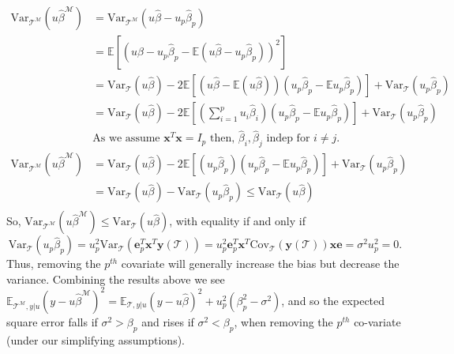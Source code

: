 \documentclass{article}
\begin{document}
\begin{equation*}
\begin{split}
\text{Var}_{\mathcal{T}^\mathcal{M}}(u\hat{\beta}^\mathcal{M}) &= \text{Var}_{\mathcal{T}^\mathcal{M}}(u\hat{\beta}- u_p\hat{\beta}_p) \\
&= \mathbb{E}\left[\left(u\hat{\beta}-u_p \hat{\beta}_p-\mathbb{E}(u\hat{\beta}-u_p \hat{\beta}_p)\right)^2 \right] \\
&= \text{Var}_{\mathcal{T}}(u\hat{\beta})-2\mathbb{E}\left[(u\hat{\beta}-\mathbb{E}(u\hat{\beta}))(u_p \hat{\beta}_p-\mathbb{E}u_p \hat{\beta}_p) \right] + \text{Var}_{\mathcal{T}}(u_p \hat{\beta}_p) \\
&= \text{Var}_{\mathcal{T}}(u\hat{\beta})-2\mathbb{E}\left[ \left(\sum_{i=1}^p u_i \hat{\beta}_i \right) \left(u_p \hat{\beta}_p-\mathbb{E}u_p \hat{\beta}_p \right) \right] + \text{Var}_{\mathcal{T}}(u_p \hat{\beta}_p) \\
&\text{As we assume } \textbf{x}^T\textbf{x}=I_p \text{ then, } \hat{\beta}_i, \hat{\beta}_j \text{ indep for } i \neq j. \\
\text{Var}_{\mathcal{T}^\mathcal{M}}(u\hat{\beta}^\mathcal{M}) &= \text{Var}_{\mathcal{T}}(u\hat{\beta})-2\mathbb{E}\left[(u_p \hat{\beta}_p)(u_p \hat{\beta}_p-\mathbb{E}u_p \hat{\beta}_p) \right] + \text{Var}_{\mathcal{T}}(u_p \hat{\beta}_p) \\
&= \text{Var}_{\mathcal{T}}(u\hat{\beta})- \text{Var}_{\mathcal{T}}(u_p \hat{\beta}_p) \leq \text{Var}_{\mathcal{T}}(u\hat{\beta})\\
\end{split}
\end{equation*}
So, $\text{Var}_{\mathcal{T}^\mathcal{M}}(u\hat{\beta}^\mathcal{M}) \leq \text{Var}_{\mathcal{T}}(u\hat{\beta})$, with equality if and only if 
\begin{equation*}
\text{Var}_{\mathcal{T}}(u_p \hat{\beta}_p)=u_p^2 \text{Var}_{\mathcal{T}}(\mathbf{e}_p^T \mathbf{x}^T \mathbf{y}(\mathcal{T})) = u_p^2 \mathbf{e}_p^T \mathbf{x}^T \text{Cov}_{\mathcal{T}}(\mathbf{y(\mathcal{T})}) \mathbf{x} \mathbf{e} = \sigma^2 u_p^2 = 0.
\end{equation*}
Thus, removing the $p^{th}$ covariate will generally increase the bias but decrease the variance. Combining the results above we see $\mathbb{E}_{\mathcal{T}^\mathcal{M},y|u}(y-u\hat{\beta}^\mathcal{M})^2 = \mathbb{E}_{\mathcal{T},y|u}(y-u\hat{\beta})^2+ u_p^2 (\beta_p^2 - \sigma^2)$, and so the expected square error falls if $\sigma^2>\beta_p$ and rises if $\sigma^2<\beta_p$, when removing the $p^{th}$ co-variate (under our simplifying assumptions).
\end{document}
